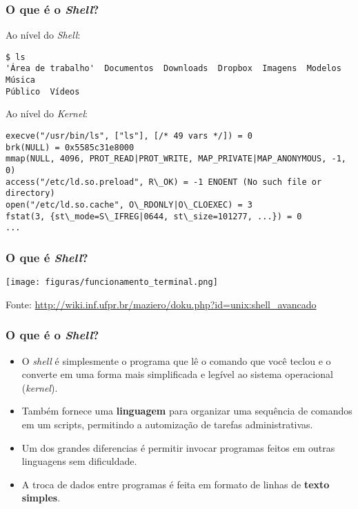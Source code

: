 \documentclass{beamer}
\begin{document}
\begin{frame}[fragile]
      \frametitle{O que é o \textit{Shell}?}
	      \scriptsize
      \begin{block}{Ao nível do \textit{Shell}:}
      \begin{verbatim}
$ ls 
'Área de trabalho'  Documentos  Downloads  Dropbox  Imagens  Modelos  Música 
Público  Vídeos
      \end{verbatim}
      \end{block}
      \begin{block}{Ao nível do \textit{Kernel}:}
      \scriptsize
      \begin{verbatim}
execve("/usr/bin/ls", ["ls"], [/* 49 vars */]) = 0 
brk(NULL) = 0x5585c31e8000 
mmap(NULL, 4096, PROT_READ|PROT_WRITE, MAP_PRIVATE|MAP_ANONYMOUS, -1, 0) 
access("/etc/ld.so.preload", R\_OK) = -1 ENOENT (No such file or directory) 
open("/etc/ld.so.cache", O\_RDONLY|O\_CLOEXEC) = 3 
fstat(3, {st\_mode=S\_IFREG|0644, st\_size=101277, ...}) = 0 
...
      \end{verbatim}
      \end{block}
\end{frame}

\begin{frame}
   \frametitle{O que é \textit{Shell}?}
   \begin{center}
   \texttt{[image: figuras/funcionamento\_terminal.png]}
   \end{center}
   \tiny
   Fonte: \url{http://wiki.inf.ufpr.br/maziero/doku.php?id=unix:shell_avancado}
\end{frame}

   \begin{frame}
      \frametitle{O que é o \textit{Shell}?}
      \begin{itemize}
         \item O \textit{shell} é simplesmente o programa que lê o comando que você teclou e o converte em uma forma mais simplificada e legível ao sistema operacional (\textit{kernel}). 
         \item Também fornece uma \textbf{linguagem} para organizar uma sequência de comandos em um scripts, permitindo a automização de tarefas administrativas. 
	 \item Um dos grandes diferencias é permitir invocar programas feitos em outras linguagens sem dificuldade.
	 \item A troca de dados entre programas é feita em formato de linhas de \textbf{texto simples}.
      \end{itemize}
   \end{frame}
\end{document}
